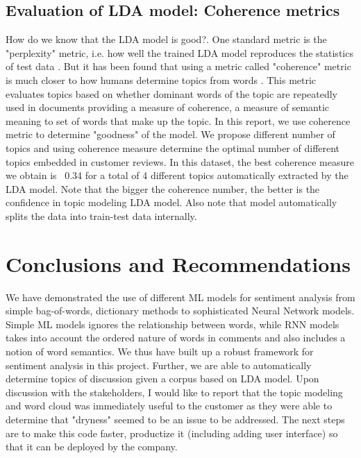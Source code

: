 \documentclass[11pt, letterpaper]{article}
\begin{document}
\subsection{Evaluation of LDA model: Coherence metrics}
How do we know that the LDA model is good?. One standard metric is the "perplexity" metric, i.e. how well the trained LDA model reproduces the statistics of test data \autocite{perplexity}. But it has been found that using a metric called "coherence" metric is much closer to how humans determine topics from words \autocite{topicmodelingcoherence}. This metric evaluates topics based on whether dominant words of the topic are repeatedly used in documents providing a measure of coherence, a measure of semantic meaning to set of words that make up the topic. In this report, we use coherence metric to determine "goodness" of the model. We propose different number of topics and using coherence measure determine the optimal number of different topics embedded in customer reviews. In this dataset, the best coherence measure we obtain is ~0.34 for a total of 4 different topics automatically extracted by the LDA model. Note that the bigger the coherence number, the better is the confidence in topic modeling LDA model. Also note that model automatically splits the data into train-test data internally. 

\section{Conclusions and Recommendations}
We have demonstrated the use of different ML models for sentiment analysis from simple bag-of-words, dictionary methods to sophisticated Neural Network models. Simple ML models ignores the relationship between words, while RNN models takes into account the ordered nature of words in comments and also includes a notion of word semantics. We thus have built up a robust framework for sentiment analysis in this project. Further, we are able to automatically determine topics of discussion given a corpus based on LDA model. Upon discussion with the stakeholders, I would like to report that the topic modeling and word cloud was immediately useful to the customer as they were able to determine that "dryness" seemed to be an issue to be addressed. The next steps are to make this code faster, productize it (including adding user interface) so that it can be deployed by the company.
\end{document}
